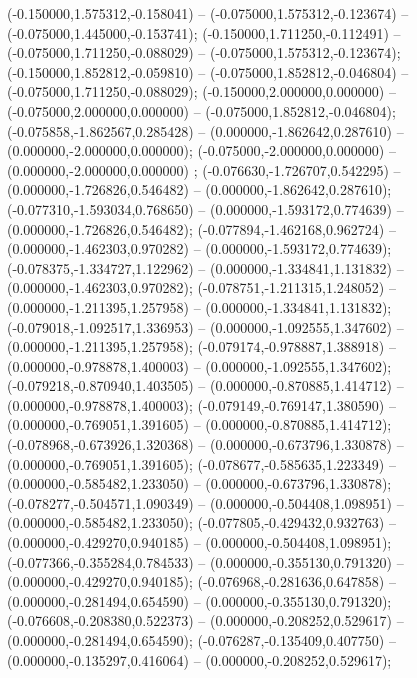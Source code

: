  (-0.150000,1.575312,-0.158041) -- (-0.075000,1.575312,-0.123674) -- (-0.075000,1.445000,-0.153741);
 (-0.150000,1.711250,-0.112491) -- (-0.075000,1.711250,-0.088029) -- (-0.075000,1.575312,-0.123674);
 (-0.150000,1.852812,-0.059810) -- (-0.075000,1.852812,-0.046804) -- (-0.075000,1.711250,-0.088029);
 (-0.150000,2.000000,0.000000) -- (-0.075000,2.000000,0.000000) -- (-0.075000,1.852812,-0.046804);
 (-0.075858,-1.862567,0.285428) -- (0.000000,-1.862642,0.287610) -- (0.000000,-2.000000,0.000000);
 (-0.075000,-2.000000,0.000000) -- (0.000000,-2.000000,0.000000) ;
 (-0.076630,-1.726707,0.542295) -- (0.000000,-1.726826,0.546482) -- (0.000000,-1.862642,0.287610);
 (-0.077310,-1.593034,0.768650) -- (0.000000,-1.593172,0.774639) -- (0.000000,-1.726826,0.546482);
 (-0.077894,-1.462168,0.962724) -- (0.000000,-1.462303,0.970282) -- (0.000000,-1.593172,0.774639);
 (-0.078375,-1.334727,1.122962) -- (0.000000,-1.334841,1.131832) -- (0.000000,-1.462303,0.970282);
 (-0.078751,-1.211315,1.248052) -- (0.000000,-1.211395,1.257958) -- (0.000000,-1.334841,1.131832);
 (-0.079018,-1.092517,1.336953) -- (0.000000,-1.092555,1.347602) -- (0.000000,-1.211395,1.257958);
 (-0.079174,-0.978887,1.388918) -- (0.000000,-0.978878,1.400003) -- (0.000000,-1.092555,1.347602);
 (-0.079218,-0.870940,1.403505) -- (0.000000,-0.870885,1.414712) -- (0.000000,-0.978878,1.400003);
 (-0.079149,-0.769147,1.380590) -- (0.000000,-0.769051,1.391605) -- (0.000000,-0.870885,1.414712);
 (-0.078968,-0.673926,1.320368) -- (0.000000,-0.673796,1.330878) -- (0.000000,-0.769051,1.391605);
 (-0.078677,-0.585635,1.223349) -- (0.000000,-0.585482,1.233050) -- (0.000000,-0.673796,1.330878);
 (-0.078277,-0.504571,1.090349) -- (0.000000,-0.504408,1.098951) -- (0.000000,-0.585482,1.233050);
 (-0.077805,-0.429432,0.932763) -- (0.000000,-0.429270,0.940185) -- (0.000000,-0.504408,1.098951);
 (-0.077366,-0.355284,0.784533) -- (0.000000,-0.355130,0.791320) -- (0.000000,-0.429270,0.940185);
 (-0.076968,-0.281636,0.647858) -- (0.000000,-0.281494,0.654590) -- (0.000000,-0.355130,0.791320);
 (-0.076608,-0.208380,0.522373) -- (0.000000,-0.208252,0.529617) -- (0.000000,-0.281494,0.654590);
 (-0.076287,-0.135409,0.407750) -- (0.000000,-0.135297,0.416064) -- (0.000000,-0.208252,0.529617);
